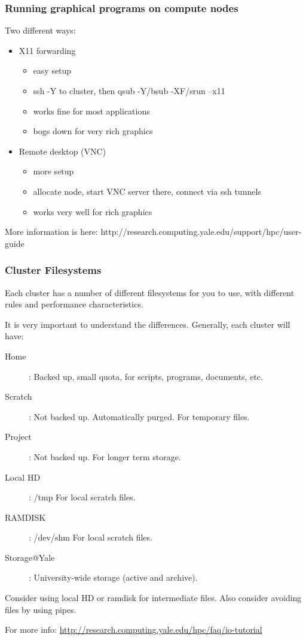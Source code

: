 \documentclass[10pt]{beamer}
\begin{document}
\begin{frame}[fragile]
\frametitle{Running graphical programs on compute nodes}
Two different ways:
\begin{itemize}
\item X11 forwarding
\begin{itemize}
\item easy setup
\item ssh -Y to cluster, then qsub -Y/bsub -XF/srun --x11
\item works fine for most applications
\item bogs down for very rich graphics
\end{itemize}
\item Remote desktop (VNC)
\begin{itemize}
\item more setup
\item allocate node, start VNC server there, connect via ssh tunnels
\item works very well for rich graphics
\end{itemize}
\end{itemize}

More information is here:
http://research.computing.yale.edu/support/hpc/user-guide

\end{frame}

\begin{frame}[fragile]
\frametitle{Cluster Filesystems}
Each cluster has a number of different filesystems for you to use, with different
rules and performance characteristics.  

\vskip10pt

It is very important to understand the differences.  Generally, each cluster will have:

\begin{description}
\item[Home]: Backed up, small quota, for scripts, programs, documents, etc.
\item[Scratch]: Not backed up.  Automatically purged.  For temporary files.
\item[Project]: Not backed up.  For longer term storage.
\item[Local HD]: /tmp  For local scratch files.
\item[RAMDISK]: /dev/shm For local scratch files.
\item[Storage@Yale]: University-wide storage (active and archive).
\end{description}

Consider using local HD or ramdisk for intermediate files.  Also consider avoiding files by using pipes.

For more info: \url{http://research.computing.yale.edu/hpc/faq/io-tutorial}

\end{frame}
\end{document}
